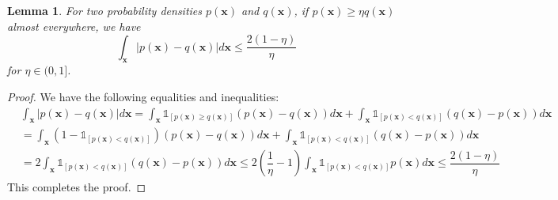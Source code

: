 \documentclass[11pt,fullpage, letterpaper,twoside]{article}
\newtheorem{lemma}{Lemma}
\newcommand{\1}[1]{\mathds{1}_{\left[#1\right]}}
\begin{document}
\begin{lemma}\label{lem3}
For two probability densities $p(\mathbf x)$ and $q(\mathbf x)$, if $p(\mathbf x)\geq \eta q(\mathbf x)$ almost everywhere, we have
$$
\int_\mathbf x |p(\mathbf x)-q(\mathbf x)|d\mathbf x \leq \dfrac{2(1-\eta)}{\eta}
$$
for $\eta\in(0,1]$.
\end{lemma}
\begin{proof}
We have the following equalities and inequalities:
\begin{equation}
\begin{aligned}
&\int_{\mathbf x} |p(\mathbf x)-q(\mathbf x)|d\mathbf x
=\int_\mathbf x \1{p(\mathbf x)\geq q(\mathbf x)} (p(\mathbf x)-q(\mathbf x))d\mathbf x
+\int_\mathbf x \1{p(\mathbf x)<q(\mathbf x)} (q(\mathbf x)-p(\mathbf x))d\mathbf x\\
&=\int_\mathbf x (1-\1{p(\mathbf x)< q(\mathbf x)}) (p(\mathbf x)-q(\mathbf x))d\mathbf x
+\int_\mathbf x \1{p(\mathbf x)<q(\mathbf x)} (q(\mathbf x)-p(\mathbf x))d\mathbf x\\
&=2\int_\mathbf x \1{p(\mathbf x)< q(\mathbf x)} (q(\mathbf x)-p(\mathbf x))d\mathbf x
\leq 2(\dfrac{1}{\eta}-1)\int_\mathbf x \1{p(\mathbf x)< q(\mathbf x)}  p(\mathbf x) d\mathbf x
\leq \dfrac{2(1-\eta)}{\eta}
\end{aligned}
\end{equation}
This completes the proof.
\end{proof}
\end{document}

